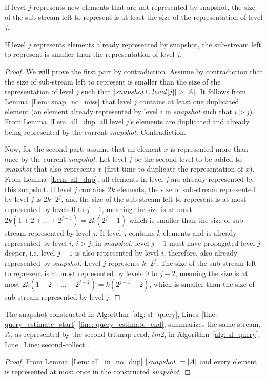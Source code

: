 \begin{lemma}\label{Lem: all_in_no_dup}
If level $j$ represents new elements that are not represented by snapshot, the size of the sub-stream left to represent is at least the size of the representation of level $j$.

If level $j$ represents elements already represented by snapshot, the sub-stream left to represent is smaller than the representation of level $j$.
\end{lemma}
\begin{proof}
We will prove the first part by contradiction. Assume by contradiction that the size of sub-stream left to represent is smaller than the size of the representation of level $j$ such that $|snapshot\cup level[j]| > |\mathnormal{A}|$. It follows from Lemma~\ref{Lem: snap_no_miss} that level $j$ contains at least one duplicated element (an element already represented by level $i$ in \emph{snapshot} such that $i>j$). From Lemma~\ref{Lem: all_dup} all level $j$'s elements are duplicated and already being represented by the current \emph{snapshot}. Contradiction. 

Now, for the second part, assume that an element $x$ is represented more than once by the current \emph{snapshot}. Let level $j$ be the second level to be added to \emph{snapshot} that also represents $x$ (first time to duplicate the representation of $x$). From Lemma~\ref{Lem: all_dup}, all elements in level $j$ are already represented by this snapshot.
If level $j$ contains $2k$ elements, the size of sub-stream represented by level $j$ is $2k\cdot2^j$, and the size of the sub-stream left to represent is at most represented by levels 0 to $j-1$, meaning the size is at most $2k(1+2+\dots+2^{j-1})=2k(2^j-1)$ which is smaller than the size of sub-stream represented by level $j$.
If level $j$ contains $k$ elements and is already represented by level $i$, $i>j$, in \emph{snapshot}, level $j-1$ must have propagated level $j$ deeper, i.e. level $j-1$ is also represented by level $i$, therefore, also already represented by \emph{snapshot}. Level $j$ represents $k\cdot2^j$. The size of the sub-stream left to represent is at most represented by levels 0 to $j-2$, meaning the size is at most $2k(1+2+\dots+2^{j-2})=k(2^{j-1}-2)$, which is smaller than the size of sub-stream represented by level $j$.
\end{proof}


\begin{lemma} \label{Lem: query_estimate}
The snapshot constructed in Algorithm~\ref{alg: sl_query}, Lines~\ref{line: query_estimate_start}-\ref{line: query_estimate_end}, summarizes the same stream, $\mathnormal{A}$, as represented by the second tritmap read, $tm2$, in Algorithm~\ref{alg: sl_query}, Line~\ref{Line: second-collect}. 
\end{lemma}
\begin{proof}
From Lemma~\ref{Lem: all_in_no_dup} $|snapshot|=|\mathnormal{A}|$ and every element is represented at most once in the constructed \emph{snapshot}.
\end{proof}

